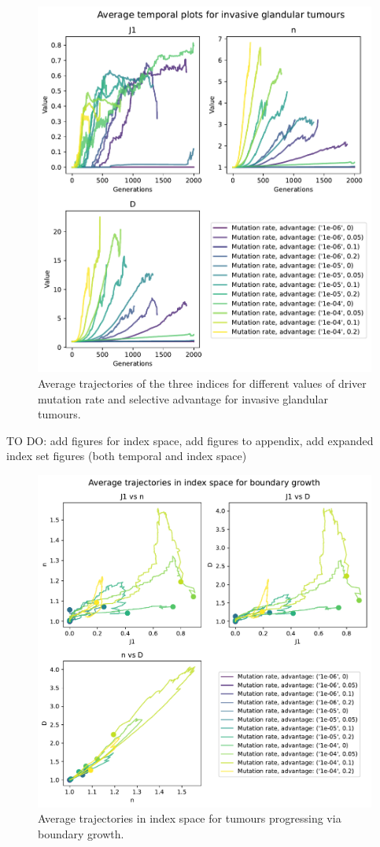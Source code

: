 \begin{figure} \centering
    \includegraphics[width=\textwidth]{Chapter_3/figures/inv-gland-temporal.pdf}
    \caption{Average trajectories of the three indices for different values of
    driver mutation rate and selective advantage for invasive glandular
    tumours.}
    \label{fig:inv-gland-temporal}
\end{figure} TO DO: add figures
for index space, add figures to appendix, add expanded index set
figures (both temporal and index space) \begin{figure}
    \centering
    \includegraphics[width=\textwidth]{Chapter_3/figures/indspace-boundary.pdf}
    \caption{Average trajectories in index space for tumours
    progressing via boundary growth.}
    \label{fig:boundary-indspace}
\end{figure}
